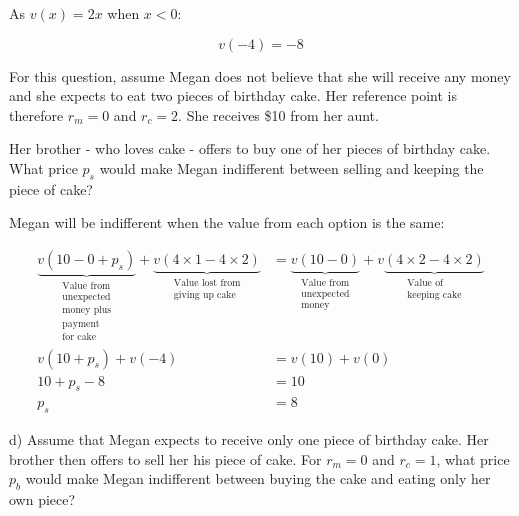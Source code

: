 \documentclass[
  letterpaper,
  DIV=11,
  numbers=noendperiod]{scrreprt}
\begin{document}
As \(v(x)=2x\) when \(x<0\):

\[
v(-4)=-8
\]

For this question, assume Megan does not believe that she will receive
any money and she expects to eat two pieces of birthday cake. Her
reference point is therefore \(r_m=0\) and \(r_c=2\). She receives \$10
from her aunt.

Her brother - who loves cake - offers to buy one of her pieces of
birthday cake. What price \(p_s\) would make Megan indifferent between
selling and keeping the piece of cake?

\begin{tcolorbox}[enhanced jigsaw, title=\textcolor{quarto-callout-tip-color}{\faLightbulb}\hspace{0.5em}{Answer}, toprule=.15mm, colback=white, breakable, titlerule=0mm, colframe=quarto-callout-tip-color-frame, coltitle=black, opacityback=0, rightrule=.15mm, colbacktitle=quarto-callout-tip-color!10!white, bottomtitle=1mm, opacitybacktitle=0.6, arc=.35mm, bottomrule=.15mm, toptitle=1mm, leftrule=.75mm, left=2mm]

Megan will be indifferent when the value from each option is the same:

\begin{align*}
\underbrace{v(10-0+p_s)}_{\substack{\textrm{Value from} \\ \textrm{unexpected} \\ \textrm{money plus} \\  \textrm{payment} \\ \textrm{for cake}}}+
\underbrace{v(4\times 1-4\times 2)}_{\substack{\textrm{Value lost from} \\ \textrm{giving up cake}}}
&=\underbrace{v(10-0)}_{\substack{\textrm{Value from} \\ \textrm{unexpected} \\ \textrm{money}}}+
v\underbrace{(4\times 2-4\times 2)}_{\substack{\textrm{Value of} \\ \textrm{keeping cake}}} \\[12pt]
v(10+p_s)+v(-4)&=v(10)+v(0) \\[6pt]
10+p_s-8&=10\\[6pt]
p_s&=8
\end{align*}

\end{tcolorbox}

d) Assume that Megan expects to receive only one piece of birthday cake.
Her brother then offers to sell her his piece of cake. For \(r_m=0\) and
\(r_c=1\), what price \(p_b\) would make Megan indifferent between
buying the cake and eating only her own piece?
\end{document}
